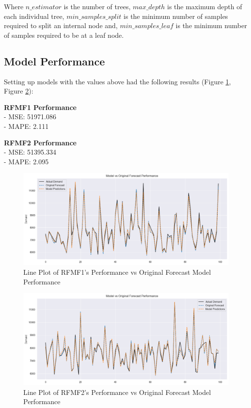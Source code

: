 \documentclass[mstat,12pt]{unswthesis}
\begin{document}
\noindent Where \(n\_estimator\) is the number of trees, \(max\_depth\) is the maximum depth of each individual tree, \(min\_samples\_split\) is the minimum number of samples required to split an internal node and, \(min\_samples\_leaf\) is the minimum number of samples required to be at a leaf node.

\subsection{Model Performance}\label{model-performance-2}

Setting up models with the values above had the following results (Figure \ref{fig:ForestModel1}, Figure \ref{fig:ForestModel2}):

\begin{multicols}{2}
\noindent\textbf{RFMF1 Performance} \\
- MSE: 51971.086 \\
- MAPE: 2.111%


\columnbreak


\noindent\textbf{RFMF2 Performance} \\
- MSE: 51395.334\\
- MAPE: 2.095%
\end{multicols}

\begin{figure}
\includegraphics[width=1\linewidth,height=0.3\textheight]{images/ForestModel1} \caption{Line Plot of RFMF1's Performance vs Original Forecast Model Performance}\label{fig:ForestModel1}
\end{figure}

\begin{figure}
\includegraphics[width=1\linewidth,height=0.3\textheight]{images/ForestModel2} \caption{Line Plot of RFMF2's Performance vs Original Forecast Model Performance}\label{fig:ForestModel2}
\end{figure}
\end{document}
